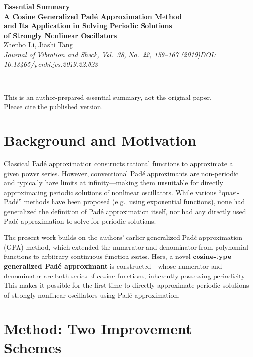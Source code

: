 \documentclass[11pt,a4paper]{article}
\begin{document}
\begin{center}
{\LARGE\bfseries\color{primary}Essential Summary}\\[12pt]
{\large\bfseries A Cosine Generalized Pad\'e Approximation Method\\and Its Application in Solving Periodic Solutions\\of Strongly Nonlinear Oscillators}\\[8pt]
{\normalsize Zhenbo Li, Jiashi Tang}\\[4pt]
{\small\itshape Journal of Vibration and Shock, Vol.\ 38, No.\ 22, 159--167 (2019)\quad DOI: 10.13465/j.cnki.jvs.2019.22.023}\\[6pt]
{\small\rule{0.7\textwidth}{0.5pt}}\\[4pt]
{\small\color{accent}This is an author-prepared essential summary, not the original paper.\\Please cite the published version.}
\end{center}

\vspace{0.5em}

\section{Background and Motivation}

Classical Pad\'e approximation constructs rational functions to approximate a given power series. However, conventional Pad\'e approximants are non-periodic and typically have limits at infinity---making them unsuitable for directly approximating periodic solutions of nonlinear oscillators. While various ``quasi-Pad\'e'' methods have been proposed (e.g., using exponential functions), none had generalized the definition of Pad\'e approximation itself, nor had any directly used Pad\'e approximation to solve for periodic solutions.

The present work builds on the authors' earlier generalized Pad\'e approximation (GPA) method, which extended the numerator and denominator from polynomial functions to arbitrary continuous function series. Here, a novel \textbf{cosine-type generalized Pad\'e approximant} is constructed---whose numerator and denominator are both series of cosine functions, inherently possessing periodicity. This makes it possible for the first time to directly approximate periodic solutions of strongly nonlinear oscillators using Pad\'e approximation.

\section{Method: Two Improvement Schemes}
\end{document}
